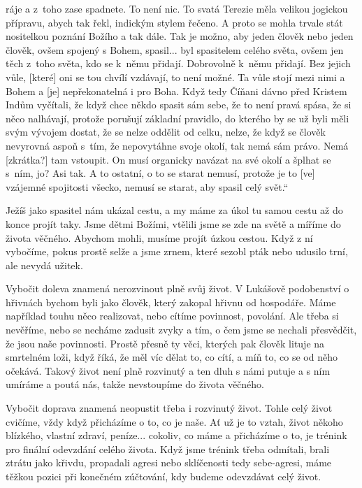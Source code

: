 \begin{enumerate}
{{ráje a z~toho zase spadnete. To není nic. To svatá Terezie měla velikou jogickou
přípravu, abych tak řekl, indickým stylem řečeno. A proto se mohla trvale stát
nositelkou poznání Božího a tak dále. Tak je možno, aby jeden člověk nebo jeden
člověk, ovšem spojený s Bohem, spasil... byl spasitelem celého světa, ovšem jen
těch z~toho světa, kdo se k~němu přidají. Dobrovolně k~němu přidají. Bez jejich
vůle, [které] oni se tou chvílí vzdávají, to není možné. Ta vůle stojí mezi nimi
a Bohem a [je] nepřekonatelná i pro Boha. Když tedy Číňani dávno před Kristem
Indům vyčítali, že když chce někdo spasit sám sebe, že to není pravá spása, že
si něco nalhávají, protože porušují základní pravidlo, do kterého by se už byli
měli svým vývojem dostat, že se nelze oddělit od celku, nelze, že když se člověk
nevyrovná aspoň s~tím, že nepovytáhne svoje okolí, tak nemá sám právo. Nemá
[zkrátka?] tam vstoupit. On musí organicky navázat na své okolí a šplhat se
s~ním, jo? Asi tak. A to ostatní, o to se starat nemusí, protože je to [ve]
vzájemné spojitosti všecko, nemusí se starat, aby spasil celý svět.``
}
}

\end{enumerate}

Ježíš jako spasitel nám ukázal cestu, a my máme za úkol tu samou cestu až do konce projít taky. Jsme dětmi Božími, vtělili jsme se zde na světě a míříme do života věčného. Abychom mohli, musíme projít úzkou cestou. Když z ní vybočíme, pokus prostě selže a jsme zrnem, které sezobl pták nebo udusilo trní, ale nevydá užitek.

Vybočit doleva znamená nerozvinout plně svůj život. V Lukášově podobenství o hřivnách bychom byli jako člověk, který zakopal hřivnu od hospodáře. Máme například touhu něco realizovat, nebo cítíme povinnost, povolání. Ale třeba si nevěříme, nebo se necháme zadusit zvyky a tím, o čem jsme se nechali přesvědčit, že jsou naše povinnosti. Prostě přesně ty věci, kterých pak člověk lituje na smrtelném loži, když říká, že měl víc dělat to, co cítí, a míň to, co se od něho očekává. Takový život není plně rozvinutý a ten dluh s námi putuje a s ním umíráme a poutá nás, takže nevstoupíme do života věčného.

Vybočit doprava znamená neopustit třeba i rozvinutý život. Tohle celý život cvičíme, vždy když přicházíme o to, co je naše. Ať už je to vztah, život někoho blízkého, vlastní zdraví, peníze... cokoliv, co máme a přicházíme o to, je trénink pro finální odevzdání celého života. Když jsme trénink třeba odmítali, brali ztrátu jako křivdu, propadali agresi nebo sklíčenosti tedy sebe-agresi, máme těžkou pozici při konečném zúčtování, kdy budeme odevzdávat celý život.

